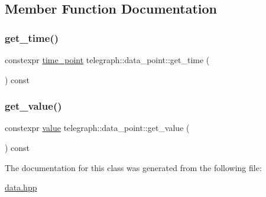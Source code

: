 \subsection{Member Function Documentation}
\mbox{\label{classtelegraph_1_1data__point_a03075d4e2943d51fe6c411897df8d443}} 
\subsubsection{\texorpdfstring{get\+\_\+time()}{get\_time()}}
{\footnotesize\ttfamily constexpr \hyperlink{namespacetelegraph_a0f1714084e0d249aa06f757c9159c0ca}{time\+\_\+point} telegraph\+::data\+\_\+point\+::get\+\_\+time (\begin{DoxyParamCaption}{ }\end{DoxyParamCaption}) const\hspace{0.3cm}{\ttfamily [inline]}}

\mbox{\label{classtelegraph_1_1data__point_a93a646507e5a1bccbffa96ced8770992}} 
\subsubsection{\texorpdfstring{get\+\_\+value()}{get\_value()}}
{\footnotesize\ttfamily constexpr \hyperlink{classtelegraph_1_1value}{value} telegraph\+::data\+\_\+point\+::get\+\_\+value (\begin{DoxyParamCaption}{ }\end{DoxyParamCaption}) const\hspace{0.3cm}{\ttfamily [inline]}}



The documentation for this class was generated from the following file\+:\begin{DoxyCompactItemize}
\item 
\hyperlink{data_8hpp}{data.\+hpp}\end{DoxyCompactItemize}
